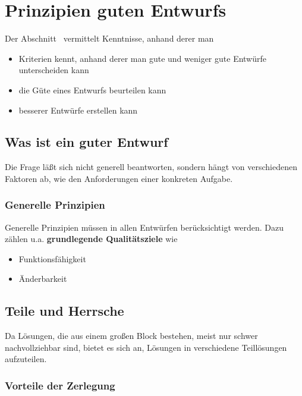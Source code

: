 \section{Prinzipien guten Entwurfs}

Der Abschnitt~\cite[69, 3.7 Prinzipien guten Entwurfs]{Wed09b} vermittelt Kenntnisse, anhand derer man

\begin{itemize}
    \item Kriterien kennt, anhand derer man gute und weniger gute Entwürfe unterscheiden kann
    \item die Güte eines Entwurfs beurteilen kann
    \item besserer Entwürfe erstellen kann
\end{itemize}

\subsection{Was ist ein guter Entwurf}

Die Frage läßt sich nicht generell beantworten, sondern hängt von verschiedenen Faktoren ab, wie den Anforderungen einer konkreten Aufgabe.\\

\subsubsection*{Generelle Prinzipien}

Generelle Prinzipien müssen in allen Entwürfen berücksichtigt werden.
Dazu zählen u.a. \textbf{grundlegende Qualitätsziele} wie

\begin{itemize}
    \item Funktionsfähigkeit
    \item Änderbarkeit
\end{itemize}

\subsection{Teile und Herrsche}
Da Lösungen, die aus einem großen Block bestehen, meist nur schwer nachvollziehbar sind, bietet es sich an, Lösungen in verschiedene Teillösungen aufzuteilen.

\subsubsection*{Vorteile der Zerlegung}

